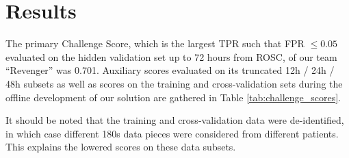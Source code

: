 \section{Results}
\label{sec:results}


The primary Challenge Score, which is the largest TPR such that FPR $\le 0.05$ evaluated on the hidden validation set up to 72 hours from ROSC, of our team ``Revenger'' was 0.701. Auxiliary scores evaluated on its truncated 12h / 24h / 48h subsets as well as scores on the training and cross-validation sets during the offline development of our solution are gathered in Table \ref{tab:challenge_scores}.



It should be noted that the training and cross-validation data were de-identified, in which case different 180s data pieces were considered from different patients. This explains the lowered scores on these data subsets.
